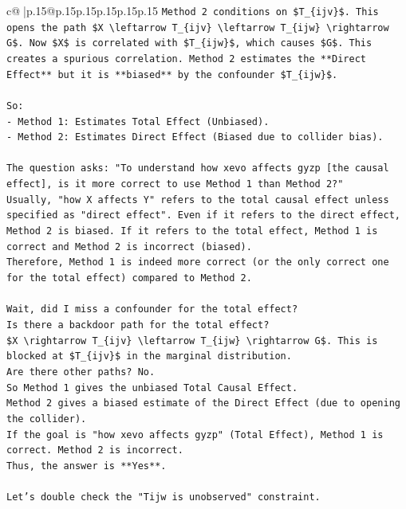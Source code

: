 \documentclass{article}
\begin{document}
{\begin{supertabular}{c@{$\;$}|p{.15\linewidth}@{}p{.15\linewidth}p{.15\linewidth}p{.15\linewidth}p{.15\linewidth}p{.15\linewidth}}
{{{\texttt{Method 2 conditions on \$T\_\{ijv\}\$. This opens the path \$X \textbackslash{}leftarrow T\_\{ijv\} \textbackslash{}leftarrow T\_\{ijw\} \textbackslash{}rightarrow G\$. Now \$X\$ is correlated with \$T\_\{ijw\}\$, which causes \$G\$. This creates a spurious correlation. Method 2 estimates the **Direct Effect** but it is **biased** by the confounder \$T\_\{ijw\}\$.} \\
\\ 
\texttt{So:} \\
\texttt{{-} Method 1: Estimates Total Effect (Unbiased).} \\
\texttt{{-} Method 2: Estimates Direct Effect (Biased due to collider bias).} \\
\\ 
\texttt{The question asks: "To understand how xevo affects gyzp {[}the causal effect{]}, is it more correct to use Method 1 than Method 2?"} \\
\texttt{Usually, "how X affects Y" refers to the total causal effect unless specified as "direct effect". Even if it refers to the direct effect, Method 2 is biased. If it refers to the total effect, Method 1 is correct and Method 2 is incorrect (biased).} \\
\texttt{Therefore, Method 1 is indeed more correct (or the only correct one for the total effect) compared to Method 2.} \\
\\ 
\texttt{Wait, did I miss a confounder for the total effect?} \\
\texttt{Is there a backdoor path for the total effect?} \\
\texttt{\$X \textbackslash{}rightarrow T\_\{ijv\} \textbackslash{}leftarrow T\_\{ijw\} \textbackslash{}rightarrow G\$. This is blocked at \$T\_\{ijv\}\$ in the marginal distribution.} \\
\texttt{Are there other paths? No.} \\
\texttt{So Method 1 gives the unbiased Total Causal Effect.} \\
\texttt{Method 2 gives a biased estimate of the Direct Effect (due to opening the collider).} \\
\texttt{If the goal is "how xevo affects gyzp" (Total Effect), Method 1 is correct. Method 2 is incorrect.} \\
\texttt{Thus, the answer is **Yes**.} \\
\\ 
\texttt{Let's double check the "Tijw is unobserved" constraint.} \\
}}}
\end{supertabular}}
\end{document}
